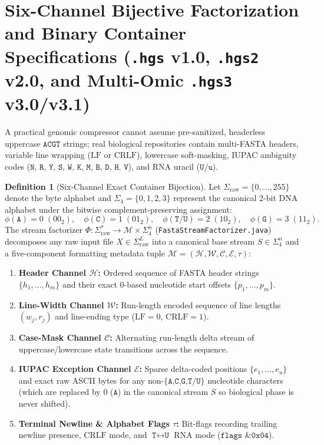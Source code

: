 \documentclass[10pt]{article}
\theoremstyle{definition}
\newtheorem{definition}{Definition}
\begin{document}
\section{Six-Channel Bijective Factorization and Binary Container Specifications (\texttt{.hgs} v1.0, \texttt{.hgs2} v2.0, and Multi-Omic \texttt{.hgs3} v3.0/v3.1)}

A practical genomic compressor cannot assume pre-sanitized, headerless uppercase $\texttt{ACGT}$ strings; real biological repositories contain multi-FASTA headers, variable line wrapping ($\text{LF}$ or $\text{CRLF}$), lowercase soft-masking, IUPAC ambiguity codes ($\texttt{N, R, Y, S, W, K, M, B, D, H, V}$), and RNA uracil ($\texttt{U/u}$).

\begin{definition}[Six-Channel Exact Container Bijection]
Let $\Sigma_{\text{raw}} = \{0,\dots,255\}$ denote the byte alphabet and $\Sigma_4 = \{0,1,2,3\}$ represent the canonical 2-bit DNA alphabet under the bitwise complement-preserving assignment:
\begin{equation}
  \phi(\texttt{A}) = 0\;(00_2),\quad \phi(\texttt{C}) = 1\;(01_2),\quad \phi(\texttt{T/U}) = 2\;(10_2),\quad \phi(\texttt{G}) = 3\;(11_2).
  \label{eq:base_map}
\end{equation}
The stream factorizer $\Phi: \Sigma_{\text{raw}}^* \to \mathcal{M} \times \Sigma_4^n$ (\texttt{FastaStreamFactorizer.java}) decomposes any raw input file $X \in \Sigma_{\text{raw}}^L$ into a canonical base stream $S \in \Sigma_4^n$ and a five-component formatting metadata tuple $\mathcal{M} = (\mathcal{H}, \mathcal{W}, \mathcal{C}, \mathcal{E}, \tau)$:
\begin{enumerate}
  \item \textbf{Header Channel $\mathcal{H}$:} Ordered sequence of FASTA header strings $\{h_1,\dots,h_m\}$ and their exact 0-based nucleotide start offsets $\{p_1,\dots,p_m\}$.
  \item \textbf{Line-Width Channel $\mathcal{W}$:} Run-length encoded sequence of line lengths $(w_j, r_j)$ and line-ending type ($\text{LF}=0$, $\text{CRLF}=1$).
  \item \textbf{Case-Mask Channel $\mathcal{C}$:} Alternating run-length delta stream of uppercase/lowercase state transitions across the sequence.
  \item \textbf{IUPAC Exception Channel $\mathcal{E}$:} Sparse delta-coded positions $\{e_1,\dots,e_u\}$ and exact raw ASCII bytes for any non-$\{\texttt{A,C,G,T/U}\}$ nucleotide characters (which are replaced by $0$ ($\texttt{A}$) in the canonical stream $S$ so biological phase is never shifted).
  \item \textbf{Terminal Newline \& Alphabet Flags $\tau$:} Bit-flags recording trailing newline presence, $\text{CRLF}$ mode, and $\texttt{T}\leftrightarrow\texttt{U}$ RNA mode ($\texttt{flags \& 0x04}$).
\end{enumerate}
\end{definition}
\end{document}
